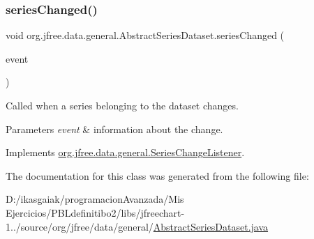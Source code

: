 \mbox{\label{classorg_1_1jfree_1_1data_1_1general_1_1_abstract_series_dataset_a675989ab4880ab0456aabb1eae97d832}} 
\subsubsection{\texorpdfstring{series\+Changed()}{seriesChanged()}}
{\footnotesize\ttfamily void org.\+jfree.\+data.\+general.\+Abstract\+Series\+Dataset.\+series\+Changed (\begin{DoxyParamCaption}\item[{\mbox{\hyperlink{classorg_1_1jfree_1_1data_1_1general_1_1_series_change_event}{Series\+Change\+Event}}}]{event }\end{DoxyParamCaption})}

Called when a series belonging to the dataset changes.


\begin{DoxyParams}{Parameters}
{\em event} & information about the change. \\
\hline
\end{DoxyParams}


Implements \mbox{\hyperlink{interfaceorg_1_1jfree_1_1data_1_1general_1_1_series_change_listener_a441fd65d1290b91e0184124be928ebf7}{org.\+jfree.\+data.\+general.\+Series\+Change\+Listener}}.



The documentation for this class was generated from the following file\+:\begin{DoxyCompactItemize}
\item 
D\+:/ikasgaiak/programacion\+Avanzada/\+Mis Ejercicios/\+P\+B\+Ldefinitibo2/libs/jfreechart-\/1../source/org/jfree/data/general/\mbox{\hyperlink{_abstract_series_dataset_8java}{Abstract\+Series\+Dataset.\+java}}\end{DoxyCompactItemize}
